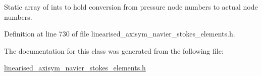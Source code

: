 Static array of ints to hold conversion from pressure node numbers to actual node numbers. 



Definition at line 730 of file linearised\+\_\+axisym\+\_\+navier\+\_\+stokes\+\_\+elements.\+h.



The documentation for this class was generated from the following file\+:\begin{DoxyCompactItemize}
\item 
\hyperlink{linearised__axisym__navier__stokes__elements_8h}{linearised\+\_\+axisym\+\_\+navier\+\_\+stokes\+\_\+elements.\+h}\end{DoxyCompactItemize}
